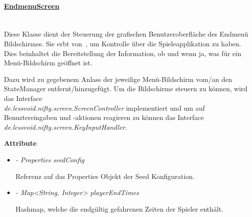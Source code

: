         \paragraph{\underline{EndmenuScreen}} \mbox{}\\
        Diese Klasse dient der Steuerung der grafischen Benutzeroberfläche
        des Endmenü Bildschirmes. Sie erbt von~, um Kontrolle über die 
        Spieleapplikation zu haben. Dies beinhaltet  die Bereitstellung der
        Information, ob und wenn ja, was für ein Menü-Bildschirm geöffnet ist. \par
        Dazu wird zu gegebenem Anlass der jeweilige Menü-Bildschirm vom/an den
        StateManager entfernt/hinzugefügt.
        Um die Bildschirme steuern zu können, wird das Interface\\
        \textit{de.lessvoid.nifty.screen.ScreenController} implementiert und um auf
        Benuztereingaben und -aktionen reagieren zu können das Interface
        \textit{de.lessvoid.nifty.screen.KeyInputHandler}.\par
            
            \textbf{Attribute}
            \begin{itemize}
                \item \textit{- Properties seedConfig}  
                    \begin{leftbar}[0.9\linewidth]
                        Referenz auf das Properties Objekt der Seed Konfiguration.
                    \end{leftbar}
                \item  \textit{- Map<String, Integer> playerEndTimes} 
                    \begin{leftbar}[0.9\linewidth]
                        Hashmap, welche die endgültig gefahrenen Zeiten der Spieler enthält.
                    \end{leftbar}
            \end{itemize}
               
